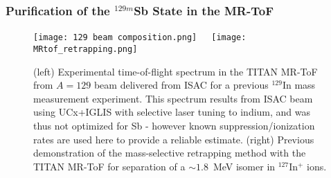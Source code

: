 \documentclass[12pt]{article}
\begin{document}
\subsubsection{Purification of the $^{129m}$Sb State in the MR-ToF}
\begin{figure}[t!]
\begin{center}
\texttt{[image: 129 beam composition.png]}~~~\texttt{[image: MRtof\_retrapping.png]}
\end{center}
\caption{\label{129spectrum} (left) Experimental time-of-flight spectrum in the TITAN MR-ToF from $A=129$ beam delivered from ISAC for a previous $^{129}$In mass measurement experiment.  This spectrum results from ISAC beam using UCx+IGLIS with selective laser tuning to indium, and was thus not optimized for Sb - however known suppression/ionization rates are used here to provide a reliable estimate.  (right) Previous demonstration of the mass-selective retrapping method with the TITAN MR-ToF for separation of a $\sim1.8$~MeV isomer in $^{127}$In$^+$ ions.}
\end{figure}
\begin{comment}
\begin{figure}[t!]
\begin{center}
\texttt{[image: Principle-of-re-trapping.png]}
\end{center}
\caption{\label{re-trapping}a) A schematic of the individual stages of an experiment using mass-selective re-trapping of ions in the TITAN MR-ToF. b) Example time-of-flight spectra of $^{40}$Ar$^{+}$ and $^{40}$K$^{+}$ after 161 turns inside the analyzer recorded on a MCP detector. c) Same spectra, but this time the ions underwent a re-trapping operation, before performing undergoing 161 turns for the mass measurement. Figure adopted from~\cite{Dickel2017}.}
\end{figure}
\end{comment}
\end{document}
